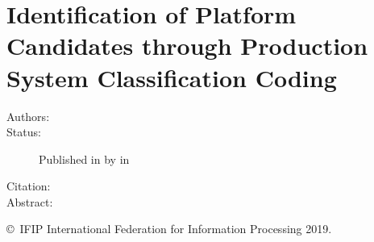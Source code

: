 \chapter[Identification of Platform Candidates through PSCC]{Identification of Platform Candidates through Production System Classification Coding}\label{paper:APMS2019}
\setcounter{page}{131}

\begin{description}
  \item[Authors:]
  \item[Status:]Published in \citeyear{SorensenAPMS2019} by  in 
  \item[Citation:]
  \item[Abstract:] 
\end{description}

\vfill
\noindent\copyright~IFIP International Federation for Information Processing 2019.

% 